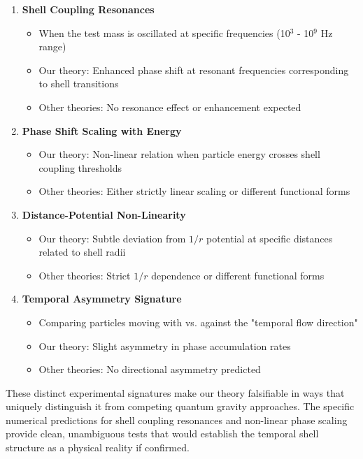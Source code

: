 \documentclass[12pt,a4paper]{article}
\begin{document}
\begin{enumerate}
    \item \textbf{Shell Coupling Resonances}
    \begin{itemize}
        \item When the test mass is oscillated at specific frequencies (10$^3$ - 10$^9$ Hz range)
        \item Our theory: Enhanced phase shift at resonant frequencies corresponding to shell transitions
        \item Other theories: No resonance effect or enhancement expected
    \end{itemize}
    
    \item \textbf{Phase Shift Scaling with Energy}
    \begin{itemize}
        \item Our theory: Non-linear relation when particle energy crosses shell coupling thresholds
        \item Other theories: Either strictly linear scaling or different functional forms
    \end{itemize}
    
    \item \textbf{Distance-Potential Non-Linearity}
    \begin{itemize}
        \item Our theory: Subtle deviation from $1/r$ potential at specific distances related to shell radii
        \item Other theories: Strict $1/r$ dependence or different functional forms
    \end{itemize}
    
    \item \textbf{Temporal Asymmetry Signature}
    \begin{itemize}
        \item Comparing particles moving with vs. against the "temporal flow direction"
        \item Our theory: Slight asymmetry in phase accumulation rates
        \item Other theories: No directional asymmetry predicted
    \end{itemize}
\end{enumerate}

These distinct experimental signatures make our theory falsifiable in ways that uniquely distinguish it from competing quantum gravity approaches. The specific numerical predictions for shell coupling resonances and non-linear phase scaling provide clean, unambiguous tests that would establish the temporal shell structure as a physical reality if confirmed.
\end{document}
